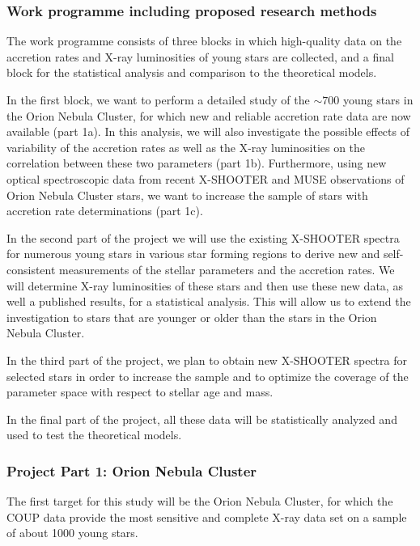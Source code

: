 \documentclass[10pt,fleqn,twoside]{article}
\newcommand{\Tcol}{\color{blue}}
\begin{document}
\subsubsection{\Tcol Work programme including proposed research methods}

The work programme consists of three blocks in which high-quality data
on the accretion rates and X-ray luminosities of young stars are collected,
and a final block for the statistical analysis and
comparison to the theoretical models.

In the first block, we want to perform a detailed study
of the $\sim 700$ young stars in the Orion Nebula Cluster, for which
 new and reliable  accretion rate data are now available (part 1a).
%
In this analysis, we will also investigate the possible effects of variability
of the accretion rates as well as the X-ray luminosities
on the correlation between these two parameters (part 1b).
%
Furthermore, using new optical spectroscopic data from recent X-SHOOTER 
and MUSE observations of Orion Nebula Cluster stars,
we want to increase the sample of stars with accretion rate
determinations (part 1c).
\medskip

In the second part of the project we will use the existing X-SHOOTER spectra for
numerous young stars
in various star forming regions to derive new and self-consistent 
measurements of the
stellar parameters and the accretion rates. 
We will determine X-ray luminosities of these stars and then
use these new data,
as well a published results, for a  statistical analysis.
This will allow us to extend the investigation to stars that are
younger or older than the stars in the Orion Nebula Cluster.


\smallskip

In the third part of the project, we plan to obtain new 
X-SHOOTER spectra for selected stars in order to increase the sample
and to optimize the coverage of the parameter space with respect
to stellar age and mass.

\smallskip

In the final part of the project,
all these data will be statistically analyzed and
used to test the theoretical models.


\subsubsection*{\Tcol Project Part 1: Orion Nebula Cluster}



The first target for this study will be the Orion Nebula Cluster,
for which the COUP data provide the most sensitive and complete
X-ray data set on a sample of about 1000 young stars.
\end{document}
